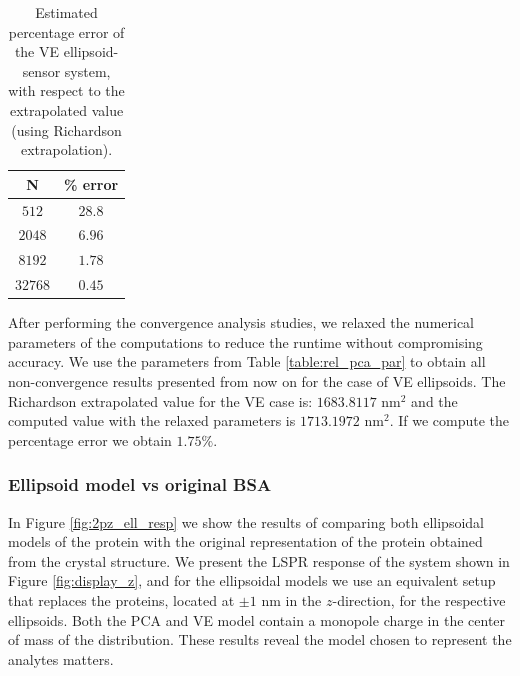  \begin{table}%
    \centering
    \caption{\label{table:err_sph-ve} Estimated percentage error of the VE ellipsoid-sensor 
    system, with respect to the extrapolated value (using Richardson extrapolation).} 
    \begin{tabular}{c c}
    \hline%
    N & \% error \\
    \hline%
     $512$ & $28.8$ \\
     $2048$ & $6.96$ \\
     $8192$ & $1.78$ \\
     $32768$ & $0.45$ \\
    \hline%
    \end{tabular}
\end{table}

After performing the convergence analysis studies, we relaxed the numerical parameters of the computations to reduce the runtime without 
compromising accuracy. We use the parameters from Table \ref{table:rel_pca_par} to obtain all non-convergence results presented from 
now on for the case of VE ellipsoids. The Richardson extrapolated value for the VE case is: $1683.8117$ nm$^2$ and the computed value with 
the relaxed parameters is $1713.1972$ nm$^2$. If we compute the percentage error we obtain $1.75 \%$.

\subsubsection{Ellipsoid model vs original BSA}\label{sssec:ell_mod_comp}

In Figure \ref{fig:2pz_ell_resp} we show the results of comparing both ellipsoidal models of the protein with the 
original representation of the protein obtained from the crystal structure. We present the LSPR response 
of the system shown in Figure \ref{fig:display_z}, and for the ellipsoidal models we use an equivalent 
setup that replaces the proteins, located at $\pm 1$ nm in the $z$-direction, for the respective ellipsoids.
Both the PCA and VE model contain a monopole charge in the center of mass of the distribution. These results reveal 
the model chosen to represent the analytes matters.

